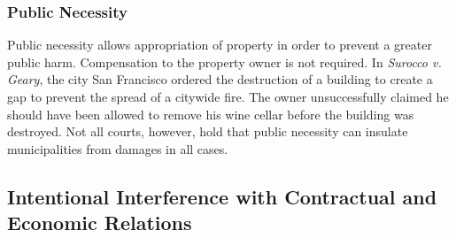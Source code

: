 \subsubsection{Public Necessity}

Public necessity allows appropriation of property in order to prevent a greater public harm. Compensation to the property owner is not required. In \emph{Surocco v. Geary}, the city San Francisco ordered the destruction of a building to create a gap to prevent the spread of a citywide fire. The owner unsuccessfully claimed he should have been allowed to remove his wine cellar before the building was destroyed. Not all courts, however, hold that public necessity can insulate municipalities from damages in all cases.

\subsection{Intentional Interference with Contractual and Economic Relations}



